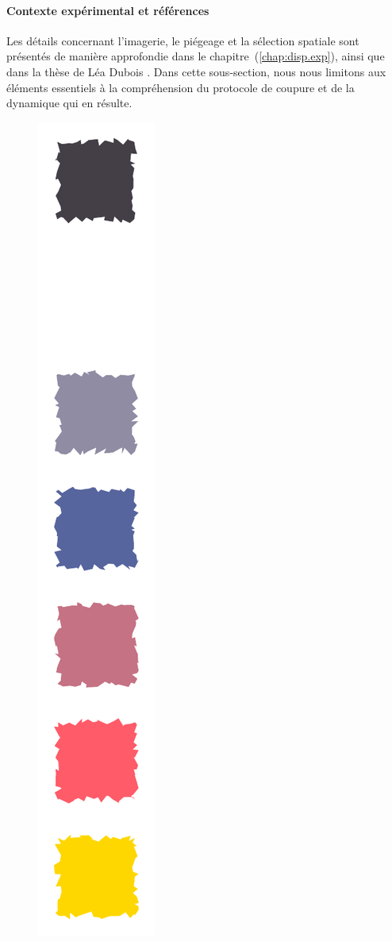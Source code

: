 \paragraph{Contexte expérimental et références}
Les détails concernant l’imagerie, le piégeage et la sélection spatiale sont présentés de manière approfondie dans le {chapitre~(\ref{chap:disp.exp})}, ainsi que dans la thèse de Léa Dubois \cite{L.Dubois2024}. Dans cette sous-section, nous nous limitons aux éléments essentiels à la compréhension du protocole de coupure et de la dynamique qui en résulte.

\begin{figure}[!htb]
\centering
\includegraphics[width=0.5\linewidth , page = 2 ]{figures/06_Bipart/Shemas_2.pdf}

\end{figure}
